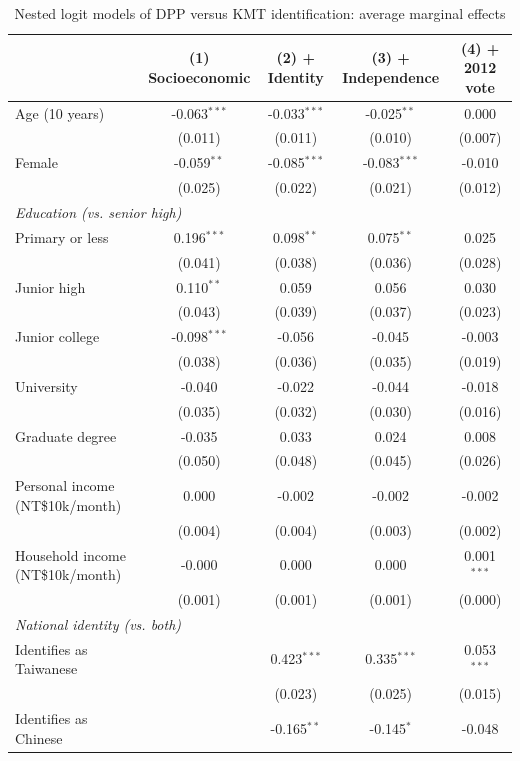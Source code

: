 \begin{table}[htbp]
\centering
\caption{Nested logit models of DPP versus KMT identification: average marginal effects}
\label{tab:covariate_blocks}
\small
\begin{tabular}{lcccc}
\toprule
 & (1) Socioeconomic & (2) + Identity & (3) + Independence & (4) + 2012 vote \\
\midrule
Age (10 years) & -0.063$^{***}$ & -0.033$^{***}$ & -0.025$^{**}$ & 0.000 \\
 & (0.011) & (0.011) & (0.010) & (0.007) \\
Female & -0.059$^{**}$ & -0.085$^{***}$ & -0.083$^{***}$ & -0.010 \\
 & (0.025) & (0.022) & (0.021) & (0.012) \\
\multicolumn{5}{l}{\textit{Education (vs. senior high)}} \\
Primary or less & 0.196$^{***}$ & 0.098$^{**}$ & 0.075$^{**}$ & 0.025 \\
 & (0.041) & (0.038) & (0.036) & (0.028) \\
Junior high & 0.110$^{**}$ & 0.059 & 0.056 & 0.030 \\
 & (0.043) & (0.039) & (0.037) & (0.023) \\
Junior college & -0.098$^{***}$ & -0.056 & -0.045 & -0.003 \\
 & (0.038) & (0.036) & (0.035) & (0.019) \\
University & -0.040 & -0.022 & -0.044 & -0.018 \\
 & (0.035) & (0.032) & (0.030) & (0.016) \\
Graduate degree & -0.035 & 0.033 & 0.024 & 0.008 \\
 & (0.050) & (0.048) & (0.045) & (0.026) \\
Personal income (NT\$10k/month) & 0.000 & -0.002 & -0.002 & -0.002 \\
 & (0.004) & (0.004) & (0.003) & (0.002) \\
Household income (NT\$10k/month) & -0.000 & 0.000 & 0.000 & 0.001$^{***}$ \\
 & (0.001) & (0.001) & (0.001) & (0.000) \\
\multicolumn{5}{l}{\textit{National identity (vs. both)}} \\
Identifies as Taiwanese &  & 0.423$^{***}$ & 0.335$^{***}$ & 0.053$^{***}$ \\
 &  & (0.023) & (0.025) & (0.015) \\
Identifies as Chinese &  & -0.165$^{**}$ & -0.145$^{*}$ & -0.048 \\

\end{tabular}
\end{table}
